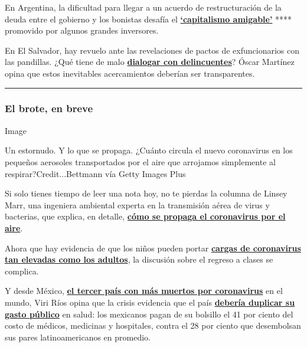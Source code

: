 En Argentina, la dificultad para llegar a un acuerdo de restructuración
de la deuda entre el gobierno y los bonistas desafía el
\textbf{\href{https://www.nytimes.com/es/2020/07/31/espanol/negocios/argentina-deuda.html}{`capitalismo
amigable'}} **** promovido por algunos grandes inversores.

En El Salvador, hay revuelo ante las revelaciones de pactos de
exfuncionarios con las pandillas. ¿Qué tiene de malo
\textbf{\href{https://www.nytimes.com/es/2020/08/02/espanol/opinion/pandillas-el-salvador.html}{dialogar
con delincuentes}}? Óscar Martínez opina que estos inevitables
acercamientos deberían ser transparentes.

\begin{center}\rule{0.5\linewidth}{\linethickness}\end{center}

\hypertarget{el-brote-en-breve}{%
\subsubsection{El brote, en breve}\label{el-brote-en-breve}}

Image

Un estornudo. Y lo que se propaga. ¿Cuánto circula el nuevo coronavirus
en los pequeños aerosoles transportados por el aire que arrojamos
simplemente al respirar?Credit...Bettmann vía Getty Images Plus

Si solo tienes tiempo de leer una nota hoy, no te pierdas la columna de
Linsey Marr, una ingeniera ambiental experta en la transmisión aérea de
virus y bacterias, que explica, en detalle,
\textbf{\href{https://www.nytimes.com/es/2020/08/01/espanol/opinion/coronavirus-aire.html}{cómo
se propaga el coronavirus por el aire}}.

Ahora que hay evidencia de que los niños pueden portar
\textbf{\href{https://www.nytimes.com/es/2020/07/31/espanol/ciencia-y-tecnologia/ninos-contagio-coronavirus.html}{cargas
de coronavirus tan elevadas como los adultos}}, la discusión sobre el
regreso a clases se complica.

Y desde México,
\textbf{\href{https://www.nytimes.com/es/interactive/2020/espanol/america-latina/coronavirus-en-mexico.html}{el
tercer país con más muertos por coronavirus}} en el mundo, Viri Ríos
opina que la crisis evidencia que el país
\textbf{\href{https://www.nytimes.com/es/2020/08/03/espanol/opinion/servicio-salud-mexico.html}{debería
duplicar su gasto público}} en salud: los mexicanos pagan de su bolsillo
el 41 por ciento del costo de médicos, medicinas y hospitales, contra el
28 por ciento que desembolsan sus pares latinoamericanos en promedio.

